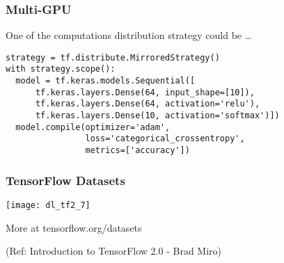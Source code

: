 \begin{frame}[fragile] \frametitle{ Multi-GPU}

One of the computations distribution strategy could be \ldots
\begin{lstlisting}
strategy = tf.distribute.MirroredStrategy()
with strategy.scope():
  model = tf.keras.models.Sequential([
      tf.keras.layers.Dense(64, input_shape=[10]),
      tf.keras.layers.Dense(64, activation='relu'),
      tf.keras.layers.Dense(10, activation='softmax')])
  model.compile(optimizer='adam',
                loss='categorical_crossentropy',
                metrics=['accuracy'])
\end{lstlisting}
\end{frame}



\begin{frame}[fragile] \frametitle{TensorFlow Datasets}

\begin{center}
\texttt{[image: dl\_tf2\_7]}
\end{center}

More at tensorflow.org/datasets

\tiny{(Ref: Introduction to TensorFlow 2.0 - Brad Miro)}
\end{frame}






